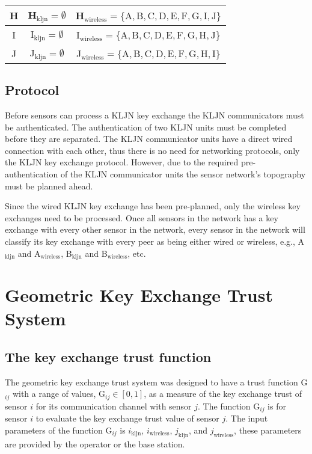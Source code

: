 \documentclass{ws-fnl2}
\begin{document}
\begin{table}[ht]
\begin{center}
\begin{tabular}{| c | c | c |}
     \hline
     H & H$_\mathrm{kljn}=\emptyset$ & H$_\mathrm{wireless}=\{\mathrm{A},\mathrm{B},\mathrm{C},\mathrm{D},\mathrm{E},\mathrm{F},\mathrm{G},\mathrm{I},\mathrm{J}\}$ \\
     \hline
     I & I$_\mathrm{kljn}=\emptyset$ & I$_\mathrm{wireless}=\{\mathrm{A},\mathrm{B},\mathrm{C},\mathrm{D},\mathrm{E},\mathrm{F},\mathrm{G},\mathrm{H},\mathrm{J}\}$ \\
     \hline
     J & J$_\mathrm{kljn}=\emptyset$ & J$_\mathrm{wireless}=\{\mathrm{A},\mathrm{B},\mathrm{C},\mathrm{D},\mathrm{E},\mathrm{F},\mathrm{G},\mathrm{H},\mathrm{I}\}$ \\
    \hline
    \end{tabular}
  \end{center}
  \label{table:ke}
\end{table}


\subsection{Protocol}

Before sensors can process a KLJN key exchange the KLJN communicators must be authenticated. The authentication of two KLJN units must be completed before they are separated. The KLJN communicator units have a direct wired connection with each other, thus there is no need for networking protocols, only the KLJN key exchange protocol. However, due to the required pre-authentication of the KLJN communicator units the sensor network's topography must be planned ahead.

Since the wired KLJN key exchange has been pre-planned, only the wireless key exchanges need to be processed. Once all sensors in the network has a key exchange with every other sensor in the network, every sensor in the network will classify its key exchange with every peer as being either wired or wireless, e.g., A$_{\mathrm{kljn}}$ and A$_{\mathrm{wireless}}$, B$_{\mathrm{kljn}}$ and B$_{\mathrm{wireless}}$, etc. 

\section{Geometric Key Exchange Trust System}

\subsection{The key exchange trust function}

The geometric key exchange trust system was designed to have a trust function G$_{ij}$ with a range of values, G$_{ij} \in [0,1]$, as a measure of the key exchange trust of sensor $i$ for its communication channel with sensor $j$. The function G$_{ij}$ is for sensor $i$ to evaluate the key exchange trust value of sensor $j$. The input parameters of the function G$_{ij}$ is $i_{\mathrm{kljn}}$, $i_{\mathrm{wireless}}$, $j_{\mathrm{kljn}}$, and $j_{\mathrm{wireless}}$, these parameters are provided by the operator or the base station. 
\end{document}
